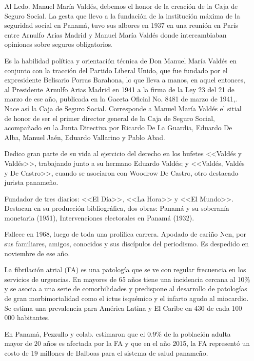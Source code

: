 \documentclass[a4paper]{article}
\let\cite=\supercite
\begin{document}
\begin{multicols}{3}
Al Lcdo. Manuel María Valdés, debemos el honor de la creación de la Caja de
Seguro Social. La gesta que llevo a la fundación de la institución máxima de
la seguridad social en Panamá, tuvo sus albores en 1937 en una reunión en
París entre Arnulfo Arias Madrid y Manuel María Valdés donde intercambiaban
opiniones sobre seguros obligatorios\cite{Pinock95}.

Es la habilidad política y orientación técnica de Don Manuel María Valdés en
conjunto con la tracción del Partido Liberal Unido, que fue fundado por el
expresidente Belisario Porras Barahona, lo que lleva a manos, en aquel entonces,
al Presidente Arnulfo Arias Madrid en 1941 a la firma de la Ley 23 del 21 de
marzo de ese año, publicada en la Gaceta Oficial No. 8481 de marzo de
1941\cite{Pinock95},\cite{gaceta1941}. Nace así la Caja de Seguro Social.
Corresponde a Manuel María Valdés el sitial de honor de ser el primer
director general de la Caja de Seguro Social, acompañado en la Junta Directiva
por Ricardo De La Guardia, Eduardo De Alba, Manuel Jaén, Eduardo Vallarino y
Pablo Abad.

Dedico gran parte de su vida al ejercicio del derecho en los bufetes <<Valdés y
Valdés>>, trabajando junto a su hermano Eduardo Valdés; y <<Valdés, Valdés y
De Castro>>, cuando se asociaron con Woodrow De Castro, otro destacado jurista
panameño.

Fundador de tres diarios: <<El Día>>, <<La Hora>> y <<El Mundo>>. Destacan en
su producción bibliográfica, dos obras: Panamá y su soberanía monetaria (1951),
Intervenciones electorales en Panamá (1932)\cite{Leonard15}.

Fallece en 1968, luego de toda una prolífica carrera. Apodado de cariño Nen,
por sus familiares, amigos, conocidos y sus discípulos del periodismo. Es
despedido en noviembre de ese año\cite{Lot68}.

\closearticle



La fibrilación atrial (FA) es una patología que se ve con regular frecuencia
en los servicios de urgencias. En mayores de 65 años tiene una incidencia
cercana al 10\% y se asocia a una serie de comorbilidades y predispone al
desarrollo de patologías de gran morbimortalidad como el ictus isquémico y el
infarto agudo al miocardio. Se estima una prevalencia para América Latina y El
Caribe en 430 de cada 100 000 habitantes\cite{brundel_atrial_2022}.

En Panamá, Pezzullo y colab. estimaron que el 0.9\% de la población adulta
mayor de 20 años es afectada por la FA y que en el año 2015, la FA representó
un costo de 19 millones de Balboas para el sistema de salud
panameño\cite{pezzullo2016}.


\end{multicols}
\end{document}
